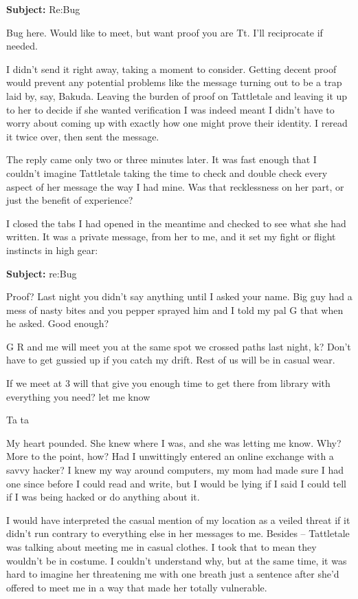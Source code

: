 {\bf Subject:} Re:Bug

Bug here. Would like to meet, but want proof you are Tt. I'll reciprocate if needed.

I didn't send it right away, taking a moment to consider. Getting decent proof would prevent any potential problems like the message turning out to be a trap laid by, say, Bakuda. Leaving the burden of proof on Tattletale and leaving it up to her to decide if she wanted verification I was indeed  meant I didn't have to worry about coming up with exactly how one might prove their identity. I reread it twice over, then sent the message.

The reply came only two or three minutes later. It was fast enough that I couldn't imagine Tattletale taking the time to check and double check every aspect of her message the way I had mine. Was that recklessness on her part, or just the benefit of experience?

I closed the tabs I had opened in the meantime and checked to see what she had written. It was a private message, from her to me, and it set my fight or flight instincts in high gear:

{\bf Subject:} re:Bug

Proof? Last night you didn't say anything until I asked your name. Big guy had a mess of nasty bites and you pepper sprayed him and I told my pal G that when he asked. Good enough?

G R and me will meet you at the same spot we crossed paths last night, k? Don't have to get gussied up if you catch my drift. Rest of us will be in casual wear.

If we meet at 3 will that give you enough time to get there from library with everything you need? let me know

Ta ta

My heart pounded. She knew where I was, and she was letting me know. Why? More to the point, how? Had I unwittingly entered an online exchange with a savvy hacker? I knew my way around computers, my mom had made sure I had one since before I could read and write, but I would be lying if I said I could tell if I was being hacked or do anything about it.

I would have interpreted the casual mention of my location as a veiled threat if it didn't run contrary to everything else in her messages to me. Besides -- Tattletale was talking about meeting me in casual clothes. I took that to mean they wouldn't be in costume. I couldn't understand why, but at the same time, it was hard to imagine her threatening me with one breath just a sentence after she'd offered to meet me in a way that made her totally vulnerable.

